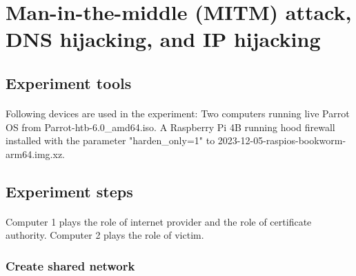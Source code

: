 \documentclass[mscthesis]{usiinfthesis}
\begin{document}
\section{Man-in-the-middle (MITM) attack, DNS hijacking, and IP hijacking}
\subsection{Experiment tools}
\paragraph{}
Following devices are used in the experiment: Two computers running live Parrot OS from Parrot-htb-6.0\_amd64.iso. A Raspberry Pi 4B running hood firewall installed with the parameter "harden\_only=1" to 2023-12-05-raspios-bookworm-arm64.img.xz.

\subsection{Experiment steps}
\paragraph{}
Computer 1 plays the role of internet provider and the role of certificate authority. Computer 2 plays the role of victim.

\subsubsection{Create shared network}
\end{document}
